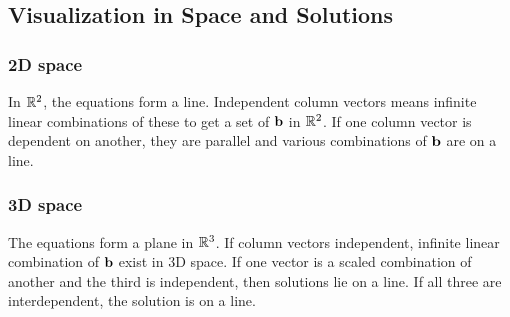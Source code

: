\subsection{Visualization in Space and Solutions}

\subsubsection{2D space}

In $\mathbb{R}^2$, the equations form a line. Independent column vectors means infinite linear combinations of these to get
a set of $\textbf{b}$ in $\mathbb{R}^2$. If one column vector is dependent on another, they are parallel and various
combinations of $\textbf{b}$ are on a line.

\subsubsection{3D space}

The equations form a plane in $\mathbb{R}^3$. If column vectors independent, infinite linear combination of $\textbf{b}$
exist in 3D space. If one vector is a scaled combination of another and the third is independent, then solutions lie
on a line. If all three are interdependent, the solution is on a line.
